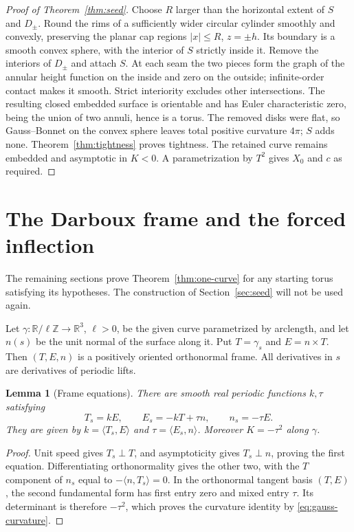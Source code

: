 \documentclass[11pt]{amsart}
\newtheorem{lemma}[theorem]{Lemma}
\theoremstyle{definition}
\newcommand{\R}{\mathbb R}
\begin{document}
\begin{proof}[Proof of Theorem~\ref{thm:seed}]
Choose $R$ larger than the horizontal extent of $S$ and $D_\pm$.
Round the rims of a sufficiently wider circular cylinder smoothly
and convexly, preserving the planar cap regions $|x|\le R$,
$z=\pm h$. Its boundary is a smooth convex sphere, with the interior
of $S$ strictly inside it. Remove the interiors of $D_\pm$ and
attach $S$. At each seam the two pieces form the graph of the
annular height function on the inside and zero on the outside;
infinite-order contact makes it smooth. Strict interiority excludes
other intersections. The resulting closed embedded surface is
orientable and has Euler characteristic zero, being the union of
two annuli, hence is a torus. The removed disks were flat,
so Gauss--Bonnet on the convex sphere leaves total positive curvature
$4\pi$; $S$ adds none. Theorem~\ref{thm:tightness} proves tightness.
The retained curve remains embedded and asymptotic in $K<0$.
A parametrization by $T^2$ gives $X_0$ and $c$ as required.
\end{proof}

\section{The Darboux frame and the forced inflection}\label{sec:frame}

The remaining sections prove Theorem~\ref{thm:one-curve} for any
starting torus satisfying its hypotheses. The construction of
Section~\ref{sec:seed} will not be used again.

Let $\gamma:\R/\ell\mathbb Z\to\R^3$, $\ell>0$, be the given curve
parametrized by arclength, and let $n(s)$ be the unit normal of
the surface along it. Put $T=\gamma_s$ and $E=n\times T$.
Then $(T,E,n)$ is a positively oriented orthonormal frame.
All derivatives in $s$ are derivatives of periodic lifts.

\begin{lemma}[Frame equations]\label{lem:frame}
There are smooth real periodic functions $k,\tau$ satisfying
\begin{equation}\label{eq:darboux}
 T_s=kE,\qquad E_s=-kT+\tau n,\qquad n_s=-\tau E.
\end{equation}
They are given by $k=\langle T_s,E\rangle$ and
$\tau=\langle E_s,n\rangle$. Moreover $K=-\tau^2$ along $\gamma$.
\end{lemma}
\begin{proof}
Unit speed gives $T_s\perp T$, and asymptoticity gives
$T_s\perp n$, proving the first equation.
Differentiating orthonormality gives the other two, with the
$T$ component of $n_s$ equal to
$-\langle n,T_s\rangle=0$.
In the orthonormal tangent basis $(T,E)$, the second fundamental
form has first entry zero and mixed entry $\tau$.
Its determinant is therefore $-\tau^2$, which proves the curvature
identity by \eqref{eq:gauss-curvature}.
\end{proof}
\end{document}
